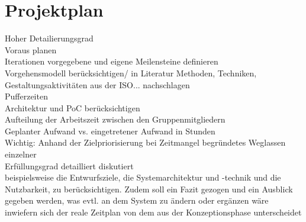 
\section{Projektplan}

Hoher Detailierungsgrad\\
Voraus planen\\
Iterationen vorgegebene und eigene Meilensteine definieren\\
Vorgehensmodell berücksichtigen/ in Literatur Methoden, Techniken, Gestaltungsaktivitäten aus der ISO... nachschlagen\\
Pufferzeiten\\
Architektur und PoC berücksichtigen\\
Aufteilung der Arbeitszeit zwischen den Gruppenmitgliedern\\
Geplanter Aufwand vs. eingetretener Aufwand in Stunden\\
Wichtig: Anhand der Zielpriorisierung bei Zeitmangel begründetes Weglassen einzelner\\


Erfüllungsgrad detailliert diskutiert\\ 
beispielsweise die Entwurfsziele, die Systemarchitektur und -technik und die Nutzbarkeit, zu berücksichtigen. Zudem soll ein Fazit gezogen und ein Ausblick gegeben werden, was evtl. an dem System zu ändern oder ergänzen wäre\\
inwiefern sich der reale Zeitplan von dem aus der Konzeptionsphase unterscheidet